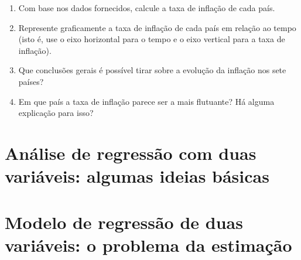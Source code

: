\documentclass[
]{article}
\providecommand{\tightlist}{%
  \setlength{\itemsep}{0pt}\setlength{\parskip}{0pt}}
\begin{document}
\begin{enumerate}
  \begin{enumerate}
  \def\labelenumii{\alph{enumii}.}
  \tightlist
  \item
    Com base nos dados fornecidos, calcule a taxa de inflação de cada país.
  \item
    Represente graficamente a taxa de inflação de cada país em relação ao tempo (isto é, use o eixo horizontal para o tempo e o eixo vertical para a taxa de inflação).
  \item
    Que conclusões gerais é possível tirar sobre a evolução da inflação nos sete países?
  \item
    Em que país a taxa de inflação parece ser a mais flutuante? Há alguma explicação para isso?
  \end{enumerate}
\end{enumerate}

\newpage

\hypertarget{anuxe1lise-de-regressuxe3o-com-duas-variuxe1veis-algumas-ideias-buxe1sicas}{%
\section{Análise de regressão com duas variáveis: algumas ideias básicas}\label{anuxe1lise-de-regressuxe3o-com-duas-variuxe1veis-algumas-ideias-buxe1sicas}}

\newpage

\hypertarget{modelo-de-regressuxe3o-de-duas-variuxe1veis-o-problema-da-estimauxe7uxe3o}{%
\section{Modelo de regressão de duas variáveis: o problema da estimação}\label{modelo-de-regressuxe3o-de-duas-variuxe1veis-o-problema-da-estimauxe7uxe3o}}
\end{document}
